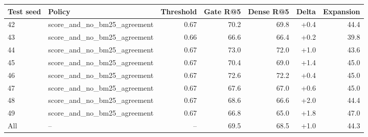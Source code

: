 \begin{tabular}{llrrrrr}
\toprule
Test seed & Policy & Threshold & Gate R@5 & Dense R@5 & Delta & Expansion \\
\midrule
42 & score\_and\_no\_bm25\_agreement & 0.67 & 70.2 & 69.8 & +0.4 & 44.4 \\
43 & score\_and\_no\_bm25\_agreement & 0.66 & 66.6 & 66.4 & +0.2 & 39.8 \\
44 & score\_and\_no\_bm25\_agreement & 0.67 & 73.0 & 72.0 & +1.0 & 43.6 \\
45 & score\_and\_no\_bm25\_agreement & 0.67 & 70.4 & 69.0 & +1.4 & 45.0 \\
46 & score\_and\_no\_bm25\_agreement & 0.67 & 72.6 & 72.2 & +0.4 & 45.0 \\
47 & score\_and\_no\_bm25\_agreement & 0.67 & 67.6 & 67.0 & +0.6 & 45.0 \\
48 & score\_and\_no\_bm25\_agreement & 0.67 & 68.6 & 66.6 & +2.0 & 44.4 \\
49 & score\_and\_no\_bm25\_agreement & 0.67 & 66.8 & 65.0 & +1.8 & 47.0 \\
\midrule
All & -- & -- & 69.5 & 68.5 & +1.0 & 44.3 \\
\bottomrule
\end{tabular}

